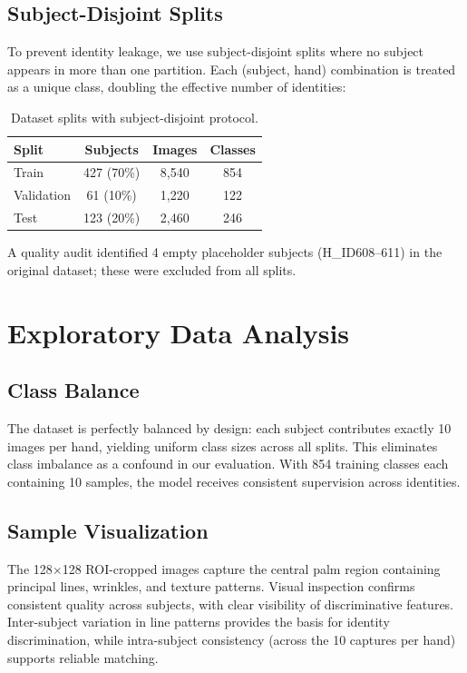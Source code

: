 \documentclass[conference]{IEEEtran}
\begin{document}
\subsection{Subject-Disjoint Splits}

To prevent identity leakage, we use subject-disjoint splits where no subject appears in more than one partition. Each (subject, hand) combination is treated as a unique class, doubling the effective number of identities:

\begin{table}[h]
\centering
\caption{Dataset splits with subject-disjoint protocol.}
\label{tab:splits}
\begin{tabular}{lccc}
\toprule
\textbf{Split} & \textbf{Subjects} & \textbf{Images} & \textbf{Classes} \\
\midrule
Train      & 427 (70\%) & 8,540  & 854 \\
Validation & 61 (10\%)  & 1,220  & 122 \\
Test       & 123 (20\%) & 2,460  & 246 \\
\bottomrule
\end{tabular}
\end{table}

A quality audit identified 4 empty placeholder subjects (H\_ID608--611) in the original dataset; these were excluded from all splits.

\section{Exploratory Data Analysis}

\subsection{Class Balance}

The dataset is perfectly balanced by design: each subject contributes exactly 10 images per hand, yielding uniform class sizes across all splits. This eliminates class imbalance as a confound in our evaluation. With 854 training classes each containing 10 samples, the model receives consistent supervision across identities.

\subsection{Sample Visualization}

The 128$\times$128 ROI-cropped images capture the central palm region containing principal lines, wrinkles, and texture patterns. Visual inspection confirms consistent quality across subjects, with clear visibility of discriminative features. Inter-subject variation in line patterns provides the basis for identity discrimination, while intra-subject consistency (across the 10 captures per hand) supports reliable matching.
\end{document}
